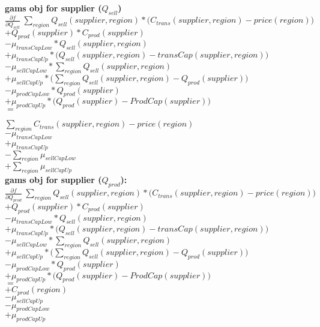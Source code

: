 \documentclass{article}
\begin{document}
\textbf{gams obj for supplier ($Q_{sell}$)}\\
$\frac{\partial f}{\partial Q_{sell}} \:\sum_{region} Q_{sell}(supplier, region) *\Big(C_{trans}(supplier,region) - price(region)\Big)$\\
$+ Q_{prod}(supplier)*C_{prod}(supplier)$\\
$-\mu_{transCapLow} * Q_{sell}(supplier, region)$\\
$+\mu_{transCapUp} *\Big( Q_{sell}(supplier, region) - transCap(supplier, region)\Big)$\\
$-\mu_{sellCapLow} * \sum_{region} Q_{sell}(supplier, region)$\\
$+\mu_{sellCapUp}*\Big(\sum_{region} Q_{sell}(supplier, region) -  Q_{prod}(supplier) \Big) $\\
$-\mu_{prodCapLow} * Q_{prod}(supplier)$\\
$+\mu_{prodCapUp}*\Big(Q_{prod}(supplier) - ProdCap(supplier)\Big)$\\

$=$

$\sum_{region} C_{trans}(supplier,region) - price(region)$\\
$-\mu_{transCapLow}$\\
$+\mu_{transCapUp} $\\
$-\sum_{region}\mu_{sellCapLow} $\\
$+\sum_{region}\mu_{sellCapUp} $\\


\textbf{gams obj for supplier ($Q_{prod}$):}\\
$\frac{\partial f}{\partial Q_{prod}} \:\sum_{region} Q_{sell}(supplier, region) *\Big(C_{trans}(supplier,region) - price(region)\Big)$\\
$+ Q_{prod}(supplier)*C_{prod}(supplier)$\\
$-\mu_{transCapLow} * Q_{sell}(supplier, region)$\\
$+\mu_{transCapUp} *\Big( Q_{sell}(supplier, region) - transCap(supplier, region)\Big)$\\
$-\mu_{sellCapLow} * \sum_{region} Q_{sell}(supplier, region)$\\
$+\mu_{sellCapUp}*\Big(\sum_{region} Q_{sell}(supplier, region) -  Q_{prod}(supplier) \Big) $\\
$-\mu_{prodCapLow} * Q_{prod}(supplier)$\\
$+\mu_{prodCapUp}*\Big(Q_{prod}(supplier) - ProdCap(supplier)\Big)$\\
$=$\\
$+C_{prod}(region)$\\
$-\mu_{sellCapUp}$\\
$-\mu_{prodCapLow}$\\
$+\mu_{prodCapUp}$\\
\end{document}

